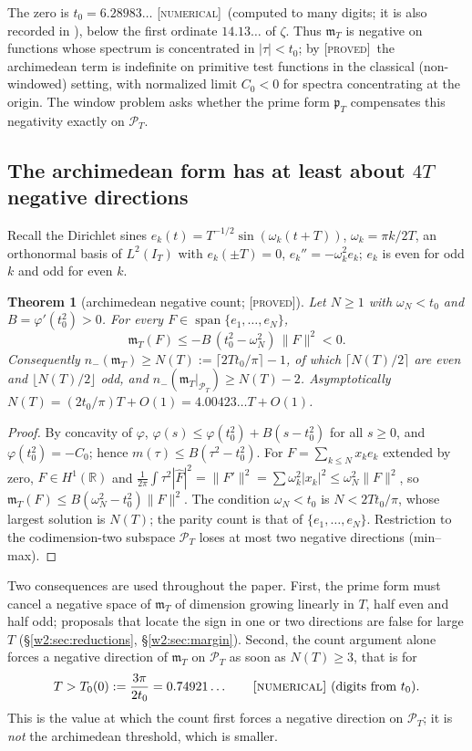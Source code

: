 \documentclass[11pt]{amsart}
\newtheorem{theorem}{Theorem}[section]
\theoremstyle{definition}
\theoremstyle{remark}
\numberwithin{equation}{section}
\newcommand{\R}{\mathbb{R}}
\DeclareMathOperator{\spn}{span}
\newcommand{\IT}{I_T}                                  %
\newcommand{\Fh}{\widehat F}                           %
\newcommand{\PT}{\mathcal{P}_T}                        %
\newcommand{\mT}{\mathfrak{m}_T}                       %
\newcommand{\pT}{\mathfrak{p}_T}                       %
\newcommand{\stag}[1]{\textsc{[#1]}}
\newcommand{\PROVED}{\stag{proved}}
\newcommand{\NUM}{\stag{numerical}}
\begin{document}
The zero is $t_0=6.28983\ldots$ \NUM\ (computed to many digits; it is also recorded in
\cite[Proposition~3.1]{P17}), below the first ordinate $14.13\ldots$ of $\zeta$. Thus $\mT$ is negative on functions
whose spectrum is concentrated in $|\tau|<t_0$; by \cite[Proposition~4.1]{P17} \PROVED\ the archimedean term is
indefinite on primitive test functions in the classical (non-windowed) setting, with normalized limit $C_0<0$ for
spectra concentrating at the origin. The window problem asks whether the prime form $\pT$ compensates this negativity
exactly on $\PT$.

\subsection{The archimedean form has at least about \texorpdfstring{$4T$}{4T} negative directions}

Recall the Dirichlet sines $e_k(t)=T^{-1/2}\sin(\omega_k(t+T))$, $\omega_k=\pi k/2T$, an orthonormal basis of
$L^2(\IT)$ with $e_k(\pm T)=0$, $e_k''=-\omega_k^2e_k$; $e_k$ is even for odd $k$ and odd for even $k$.

\begin{theorem}[archimedean negative count; \PROVED]\label{w2:thm:archcount}
Let $N\ge1$ with $\omega_N<t_0$ and $B=\varphi'(t_0^2)>0$. For every $F\in\spn\{e_1,\dots,e_N\}$,
\[
\mT(F)\le-B\,(t_0^2-\omega_N^2)\,\|F\|^2<0 .
\]
Consequently $n_-(\mT)\ge N(T):=\lceil 2Tt_0/\pi\rceil-1$, of which $\lceil N(T)/2\rceil$ are even and
$\lfloor N(T)/2\rfloor$ odd, and $n_-(\mT|_{\PT})\ge N(T)-2$. Asymptotically $N(T)=(2t_0/\pi)T+O(1)=4.00423\ldots T+O(1)$.
\end{theorem}

\begin{proof}
By concavity of $\varphi$, $\varphi(s)\le\varphi(t_0^2)+B(s-t_0^2)$ for all $s\ge0$, and $\varphi(t_0^2)=-C_0$; hence
$m(\tau)\le B(\tau^2-t_0^2)$. For $F=\sum_{k\le N}x_ke_k$ extended by zero, $F\in H^1(\R)$ and
$\frac1{2\pi}\int\tau^2|\Fh|^2=\|F'\|^2=\sum\omega_k^2|x_k|^2\le\omega_N^2\|F\|^2$, so
$\mT(F)\le B(\omega_N^2-t_0^2)\|F\|^2$. The condition $\omega_N<t_0$ is $N<2Tt_0/\pi$, whose largest solution is
$N(T)$; the parity count is that of $\{e_1,\dots,e_N\}$. Restriction to the codimension-two subspace $\PT$ loses at
most two negative directions (min--max).
\end{proof}

Two consequences are used throughout the paper. First, the prime form must cancel a negative space of $\mT$ of
dimension growing linearly in $T$, half even and half odd; proposals that locate the sign in one or two directions
are false for large $T$ (\S\ref{w2:sec:reductions}, \S\ref{w2:sec:margin}). Second, the count argument alone forces a
negative direction of $\mT$ on $\PT$ as soon as $N(T)\ge3$, that is for
\[
T>T_0(0):=\frac{3\pi}{2t_0}=0.74921\ldots \qquad\NUM\ \text{(digits from $t_0$)} .
\]
This is the value at which the count first forces a negative direction on $\PT$; it is \emph{not} the archimedean threshold, which is smaller.
\end{document}
